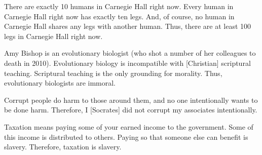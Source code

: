 \begin{exercises}
\item There are exactly 10 humans in Carnegie Hall right now. Every human in Carnegie Hall right now has exactly ten legs. And, of course, no human in Carnegie Hall shares any legs with another human. Thus, there are at least 100 legs in Carnegie Hall right now.


\item Amy Bishop is an evolutionary biologist (who shot a number of her colleagues to death in 2010). Evolutionary biology is incompatible with [Christian] scriptural teaching. Scriptural teaching is the only grounding for morality. Thus, evolutionary biologists are immoral.


\item Corrupt people do harm to those around them, and no one intentionally wants to be done harm. Therefore, I [Socrates] did not corrupt my associates intentionally.


\item Taxation means paying some of your earned income to the government. Some of this income is distributed to others. Paying so that someone else can benefit is slavery. Therefore, taxation is slavery.


%
\end{exercises}


